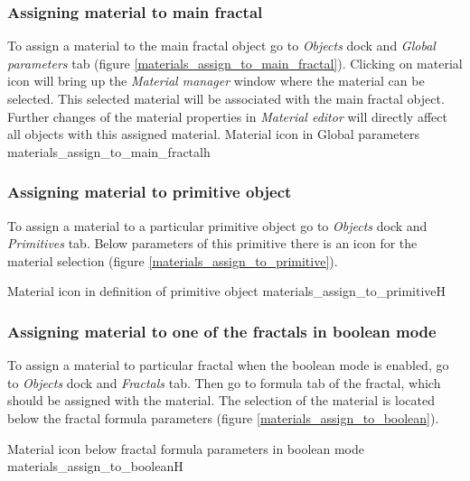 \subsubsection{Assigning material to main fractal}\label{assigning-material-to-main-fractal}

To assign a material to the main fractal object go to \emph{Objects} dock and \emph{Global parameters} tab (figure \ref{materials_assign_to_main_fractal}). Clicking on material icon will bring up the \emph{Material manager} window where the material can be selected. This selected material will be associated with the main fractal object. Further changes of the material properties in \emph{Material editor} will directly affect all objects with this assigned material.
\nopagebreak
{}
{Material icon in Global parameters}
{materials_assign_to_main_fractal}{h}

\subsubsection{Assigning material to primitive object}\label{assigning-material-to-primitive}

To assign a material to a particular primitive object go to \emph{Objects} dock and \emph{Primitives} tab. Below parameters of this primitive there is an icon for the material selection (figure \ref{materials_assign_to_primitive}).
 
\nopagebreak
{}
{Material icon in definition of primitive object}
{materials_assign_to_primitive}{H}

\subsubsection{Assigning material to one of the fractals in boolean mode}\label{assigning-material-to-boolean}

To assign a material to particular fractal when the boolean mode is enabled, go to \emph{Objects} dock and \emph{Fractals} tab. Then go to formula tab of the fractal, which should be assigned with the material. The selection of the material is located below the fractal formula parameters (figure \ref{materials_assign_to_boolean}).

\nopagebreak
{}
{Material icon below fractal formula parameters in boolean mode}
{materials_assign_to_boolean}{H}

